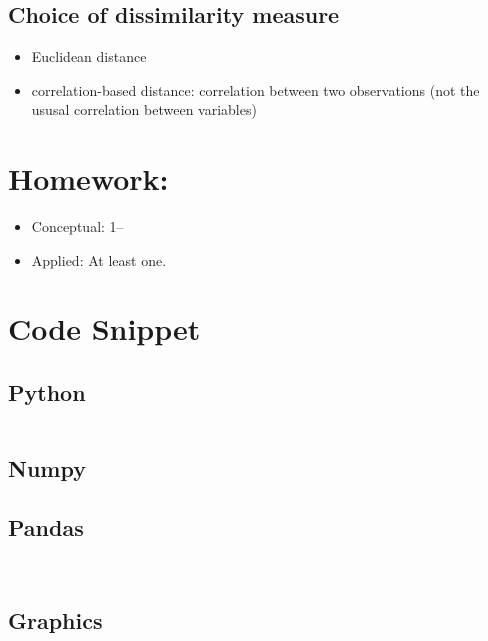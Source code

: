 \documentclass[
  letterpaper,
  DIV=11,
  numbers=noendperiod]{scrreprt}
\providecommand{\tightlist}{%
  \setlength{\itemsep}{0pt}\setlength{\parskip}{0pt}}\usepackage{longtable,booktabs,array}
\begin{document}
\subsection{Choice of dissimilarity
measure}\label{choice-of-dissimilarity-measure}

\begin{itemize}
\tightlist
\item
  Euclidean distance
\item
  correlation-based distance: correlation between two observations (not
  the ususal correlation between variables)
\end{itemize}

\section{Homework:}\label{homework-8}

\begin{itemize}
\tightlist
\item
  Conceptual: 1--
\item
  Applied: At least one.
\end{itemize}

\section{Code Snippet}\label{code-snippet-6}

\subsection{Python}\label{python-10}

\begin{verbatim}

\end{verbatim}

\subsection{Numpy}\label{numpy-10}

\subsection{Pandas}\label{pandas-10}

\begin{verbatim}


\end{verbatim}

\subsection{Graphics}\label{graphics-10}
\end{document}
